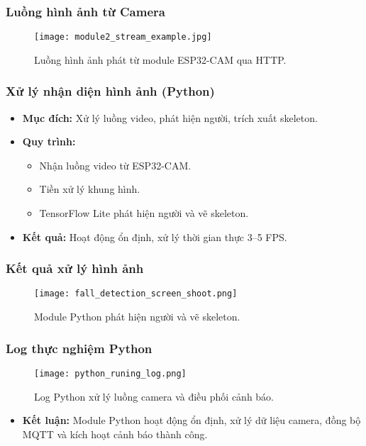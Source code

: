 \begin{frame}[t]
\frametitle{Luồng hình ảnh từ Camera}
\begin{figure}
    \centering
    \texttt{[image: module2\_stream\_example.jpg]}
    \caption{Luồng hình ảnh phát từ module ESP32-CAM qua HTTP.}
\end{figure}
\end{frame}

\begin{frame}[t]
\frametitle{Xử lý nhận diện hình ảnh (Python)}
\begin{itemize}
    \item \textbf{Mục đích:} Xử lý luồng video, phát hiện người, trích xuất skeleton.
    \item \textbf{Quy trình:}
    \begin{itemize}
        \item Nhận luồng video từ ESP32-CAM.
        \item Tiền xử lý khung hình.
        \item TensorFlow Lite phát hiện người và vẽ skeleton.
    \end{itemize}
    \item \textbf{Kết quả:} Hoạt động ổn định, xử lý thời gian thực 3–5 FPS.
\end{itemize}
\end{frame}

\begin{frame}[t]
\frametitle{Kết quả xử lý hình ảnh}
\begin{figure}
    \centering
    \texttt{[image: fall\_detection\_screen\_shoot.png]}
    \caption{Module Python phát hiện người và vẽ skeleton.}
\end{figure}
\end{frame}
  



\begin{frame}[fragile]
\frametitle{Log thực nghiệm Python}
\begin{figure}[H]
    \centering
    \texttt{[image: python\_runing\_log.png]}
    \caption{Log Python xử lý luồng camera và điều phối cảnh báo.}
\end{figure}
\begin{itemize}
    \item \textbf{Kết luận:} Module Python hoạt động ổn định, xử lý dữ liệu camera, đồng bộ MQTT và kích hoạt cảnh báo thành công.
\end{itemize}
\end{frame}

